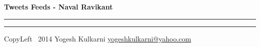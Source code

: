 

\usepackage{beamerarticle} %



\begin{center}
     \Large{\textbf{Tweets Feeds - Naval Ravikant }}  %
\end{center}
\rule{\linewidth}{0.25pt}
\raggedright
\footnotesize
\begin{multicols}{3}




\rule{0.3\linewidth}{0.25pt}

\scriptsize
CopyLeft \textcopyleft\ 2014 Yogesh Kulkarni
\href{http://www.yogeshkulkarni.com}{yogeshkulkarni@yahoo.com}

\end{multicols}

